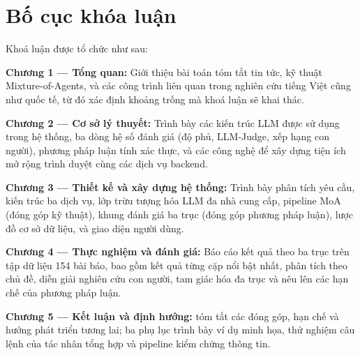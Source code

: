 \section*{Bố cục khóa luận}

Khoá luận được tổ chức như sau:

\textbf{Chương 1 --- Tổng quan:} Giới thiệu bài toán tóm tắt tin tức,
kỹ thuật Mixture-of-Agents, và các công trình liên quan trong nghiên cứu tiếng Việt
cũng như quốc tế, từ đó xác định khoảng trống mà khoá luận sẽ khai thác.

\textbf{Chương 2 --- Cơ sở lý thuyết:} Trình bày các kiến trúc LLM được sử dụng
trong hệ thống, ba dòng hệ số đánh giá (độ phủ, LLM-Judge, xếp hạng con người),
phương pháp luận tính xác thực, và các công nghệ để xây dựng tiện ích mở rộng trình
duyệt cùng các dịch vụ backend.

\textbf{Chương 3 --- Thiết kế và xây dựng hệ thống:} Trình bày phân tích yêu cầu,
kiến trúc ba dịch vụ, lớp trừu tượng hóa LLM đa nhà cung cấp, pipeline MoA (đóng
góp kỹ thuật), khung đánh giá ba trục (đóng góp phương pháp luận), lược đồ cơ sở
dữ liệu, và giao diện người dùng.

\textbf{Chương 4 --- Thực nghiệm và đánh giá:} Báo cáo kết quả theo ba trục trên
tập dữ liệu 154 bài báo, bao gồm kết quả từng cặp nổi bật nhất, phân tích theo chủ đề, diễn giải nghiên cứu
con người, tam giác hóa đa trục và nêu lên các hạn chế của phương pháp luận.

\textbf{Chương 5 --- Kết luận và định hướng:} tóm tắt các đóng góp, hạn chế và hướng phát triển tương lai;
ba phụ lục trình bày ví dụ minh họa, thử nghiệm câu lệnh của tác nhân tổng hợp và
pipeline kiểm chứng thông tin.
